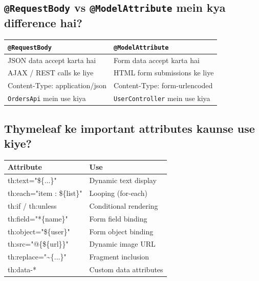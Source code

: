 \documentclass[12pt,a4paper]{article}
\begin{document}
\subsection{\texttt{@RequestBody} vs \texttt{@ModelAttribute} mein kya difference hai?}

\begin{answerbox}
\begin{center}
\begin{tabular}{p{6cm} p{6cm}}
\toprule
\textbf{\texttt{@RequestBody}} & \textbf{\texttt{@ModelAttribute}} \\
\midrule
JSON data accept karta hai & Form data accept karta hai \\
AJAX / REST calls ke liye & HTML form submissions ke liye \\
Content-Type: application/json & Content-Type: form-urlencoded \\
\texttt{OrdersApi} mein use kiya & \texttt{UserController} mein use kiya \\
\bottomrule
\end{tabular}
\end{center}
\end{answerbox}

\subsection{Thymeleaf ke important attributes kaunse use kiye?}

\begin{answerbox}
\begin{center}
\begin{tabular}{>{\ttfamily}l l}
\toprule
\textbf{Attribute} & \textbf{Use} \\
\midrule
th:text="\$\{...\}" & Dynamic text display \\
th:each="item : \$\{list\}" & Looping (for-each) \\
th:if / th:unless & Conditional rendering \\
th:field="*\{name\}" & Form field binding \\
th:object="\$\{user\}" & Form object binding \\
th:src="@\{\$\{url\}\}" & Dynamic image URL \\
th:replace="\~{}\{...\}" & Fragment inclusion \\
th:data-* & Custom data attributes \\
\bottomrule
\end{tabular}
\end{center}
\end{answerbox}
\end{document}
